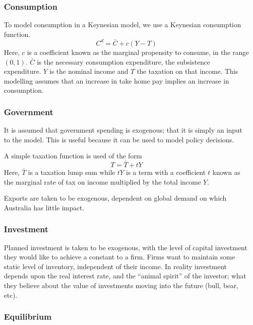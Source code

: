 \documentclass[12pt]{report}
\begin{document}
\begin{flushleft}
\subsubsection*{Consumption}

To model consumption in a Keynesian model, we use a Keynesian consumption 
function.
\[C^d = \bar{C} + c(Y - T)\]
Here, \(c\) is a coefficient known as the marginal propensity to consume, in
the range \((0, 1)\). \(\bar{C}\) is the necessary consumption expenditure, the
subsistence expenditure. \(Y\) is the nominal income and \(T\) the taxation on
that income. This modelling assumes that an increase in take home pay implies
an increase in consumption.

\subsubsection*{Government}

It is assumed that government spending is exogenous; that it is simply an input
to the model. This is useful because it can be used to model policy decisions.
\par
A simple taxation function is used of the form
\[T = \bar{T} + tY\]
Here, \(\bar{T}\) is a taxation lump sum while \(tY\) is a term with a 
coefficient \(t\) known as the marginal rate of tax on income multiplied by the
total income \(Y\). \par
Exports are taken to be exogenous, dependent on global demand on which 
Australia has little impact.

\subsubsection*{Investment}

Planned investment is taken to be exogenous, with the level of capital
investment they would like to achieve a constant to a firm. Firms want to 
maintain some static level of inventory, independent of their income. In 
reality investment depends upon the real interest rate, and the ``animal 
spirit'' of the investor; what they believe about the value of investments 
moving into the future (bull, bear, etc).

\subsubsection*{Equilibrium}


\end{flushleft}
\end{document}
